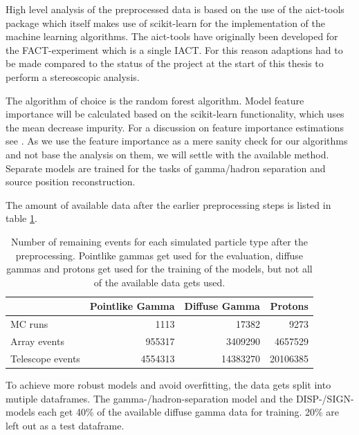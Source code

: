 High level analysis of the preprocessed data is based on the use of
the aict-tools package \cite{aict-tools} which itself makes use of
scikit-learn \cite{sklearn_api} for the implementation of the machine learning algorithms.
The aict-tools have originally been developed for the FACT-experiment
which is a single IACT. 
For this reason
adaptions had to be made compared to the status of the project at the start 
of this thesis to perform a stereoscopic analysis.

The algorithm of choice is the random forest algorithm.
Model feature importance will be calculated
based on the scikit-learn functionality, which
uses the mean decrease impurity.
For a discussion on feature importance estimations see \cite{hastie2017springer}.
As we use the feature importance as a mere sanity check for our algorithms 
and not base the analysis on them, we will settle with the available method.
Separate models are trained for the tasks of gamma/hadron
separation and source position reconstruction.

The amount of available data after the earlier 
preprocessing steps is listed in table \ref{tab:events_after_prep}.


\begin{table}
    \caption{Number of remaining events for each simulated particle type after the
    preprocessing. Pointlike gammas get used for the evaluation, diffuse gammas and protons
    get used for the training of the models, but not all of the available data gets used.}
    \begin{center}
        \begin{tabular}{l r r r}
            & Pointlike Gamma & Diffuse Gamma & Protons \\
            \hline
            MC runs & \num{1113} & \num{17382} &  \num{9273} \\ 
            Array events & \num{955317} & \num{3409290} & \num{4657529} \\
            Telescope events & \num{4554313} & \num{14383270} & \num{20106385} \\
        \end{tabular}
    \end{center}
    \label{tab:events_after_prep}
\end{table}

To achieve more robust models and avoid overfitting, the data gets split into mutiple dataframes.
The gamma-/hadron-separation model and the DISP-/SIGN-models each get 
40\% of the available diffuse gamma data for training. 20\% are left out
as a test dataframe.

